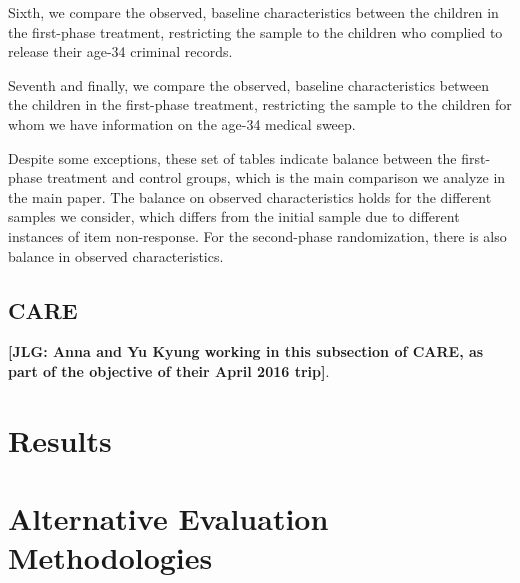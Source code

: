 \begin{appendices}


\noindent Sixth, we compare the observed, baseline characteristics between the children in the first-phase treatment, restricting the sample to the children who complied to release their age-34 criminal records.



\noindent Seventh and finally, we compare the observed, baseline characteristics between the children in the first-phase treatment, restricting the sample to the children for whom we have information on the age-34 medical sweep.



\noindent Despite some exceptions, these set of tables indicate balance between the first-phase treatment and control groups, which is the main comparison we analyze in the main paper. The balance on observed characteristics holds for the different samples we consider, which differs from the initial sample due to different instances of item non-response. For the second-phase randomization, there is also balance in observed characteristics.

\subsection{CARE}

\noindent \textbf{[JLG: Anna and Yu Kyung working in this subsection of CARE, as part of the objective of their April 2016 trip]}.

\setcounter{figure}{0}  \renewcommand{\thefigure}{B.\arabic{figure}}
\setcounter{table}{0}   \renewcommand{\thetable}{B.\arabic{table}}
\section{Results}

\setcounter{figure}{0}  \renewcommand{\thefigure}{C.\arabic{figure}}
\setcounter{table}{0}   \renewcommand{\thetable}{C.\arabic{table}}
\section{Alternative Evaluation Methodologies} \label{appendix:methodology}

\end{appendices}

\renewcommand{\refname}{Appendix References}
\clearpage
\singlespace



 